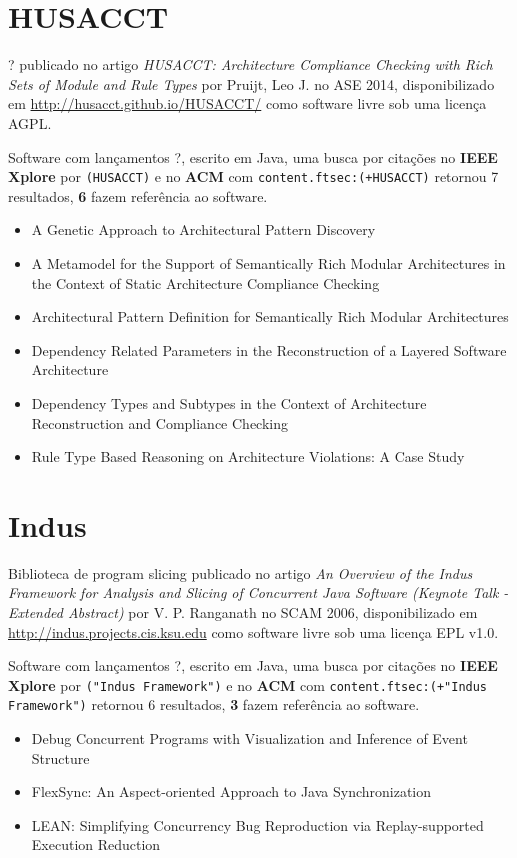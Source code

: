 \section{HUSACCT}

?
publicado no artigo {\it HUSACCT: Architecture Compliance Checking with Rich Sets of Module and Rule Types}
por Pruijt, Leo J.
no ASE 2014,
disponibilizado em \url{http://husacct.github.io/HUSACCT/}
como software livre
sob uma licença AGPL.

Software com lançamentos ?,
escrito em Java,
uma busca por citações no {\bf IEEE Xplore} por
\texttt{(HUSACCT)}
e no {\bf ACM} com
\texttt{content.ftsec:(+HUSACCT)}
retornou
7 resultados,
{\bf 6} fazem referência ao software.

\begin{itemize}
\item A Genetic Approach to Architectural Pattern Discovery
\item A Metamodel for the Support of Semantically Rich Modular Architectures in the Context of Static Architecture Compliance Checking
\item Architectural Pattern Definition for Semantically Rich Modular Architectures
\item Dependency Related Parameters in the Reconstruction of a Layered Software Architecture
\item Dependency Types and Subtypes in the Context of Architecture Reconstruction and Compliance Checking
\item Rule Type Based Reasoning on Architecture Violations: A Case Study
\end{itemize}


\section{Indus}

Biblioteca de program slicing
publicado no artigo {\it An Overview of the Indus Framework for Analysis and Slicing of Concurrent Java Software (Keynote Talk - Extended Abstract)}
por V. P. Ranganath
no SCAM 2006,
disponibilizado em \url{http://indus.projects.cis.ksu.edu}
como software livre
sob uma licença EPL v1.0.

Software com lançamentos ?,
escrito em Java,
uma busca por citações no {\bf IEEE Xplore} por
\texttt{("Indus Framework")}
e no {\bf ACM} com
\texttt{content.ftsec:(+"Indus Framework")}
retornou
6 resultados,
{\bf 3} fazem referência ao software.

\begin{itemize}
\item Debug Concurrent Programs with Visualization and Inference of Event Structure
\item FlexSync: An Aspect-oriented Approach to Java Synchronization
\item LEAN: Simplifying Concurrency Bug Reproduction via Replay-supported Execution Reduction
\end{itemize}


